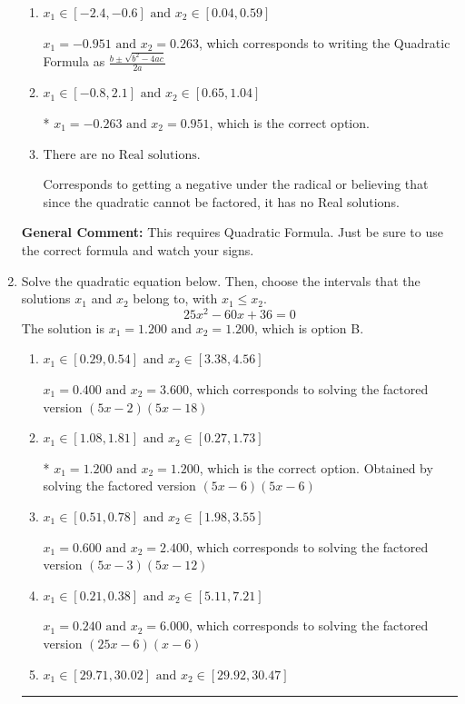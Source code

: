 \documentclass{extbook}[14pt]
\newcommand{\litem}[1]{\item #1

\rule{\textwidth}{0.4pt}}
\begin{document}
\begin{enumerate}
{\begin{enumerate}[label=\Alph*.]
 $x_1 = -4.208 \text{ and } x_2 = 15.208$, which corresponds to using the Quadratic Formula with $a=1$
\item \( x_1 \in [-2.4, -0.6] \text{ and } x_2 \in [0.04, 0.59] \)

 $x_1 = -0.951 \text{ and } x_2 = 0.263$, which corresponds to writing the Quadratic Formula as $\frac{b \pm \sqrt{b^2 - 4ac}}{2a}$
\item \( x_1 \in [-0.8, 2.1] \text{ and } x_2 \in [0.65, 1.04] \)

* $x_1 = -0.263 \text{ and } x_2 = 0.951$, which is the correct option.
\item \( \text{There are no Real solutions.} \)

Corresponds to getting a negative under the radical or believing that since the quadratic cannot be factored, it has no Real solutions.
\end{enumerate}

\textbf{General Comment:} This requires Quadratic Formula. Just be sure to use the correct formula and watch your signs.
}
\litem{
Solve the quadratic equation below. Then, choose the intervals that the solutions $x_1$ and $x_2$ belong to, with $x_1 \leq x_2$.
\[ 25x^{2} -60 x + 36 = 0 \]The solution is \( x_1 = 1.200 \text{ and } x_2 = 1.200 \), which is option B.\begin{enumerate}[label=\Alph*.]
\item \( x_1 \in [0.29, 0.54] \text{ and } x_2 \in [3.38, 4.56] \)

$x_1 = 0.400 \text{ and } x_2 = 3.600$, which corresponds to solving the factored version $(5x -2)(5x -18)$
\item \( x_1 \in [1.08, 1.81] \text{ and } x_2 \in [0.27, 1.73] \)

* $x_1 = 1.200 \text{ and } x_2 = 1.200$, which is the correct option. Obtained by solving the factored version $(5x -6)(5x -6)$
\item \( x_1 \in [0.51, 0.78] \text{ and } x_2 \in [1.98, 3.55] \)

$x_1 = 0.600 \text{ and } x_2 = 2.400$, which corresponds to solving the factored version $(5x -3)(5x -12)$
\item \( x_1 \in [0.21, 0.38] \text{ and } x_2 \in [5.11, 7.21] \)

$x_1 = 0.240 \text{ and } x_2 = 6.000$, which corresponds to solving the factored version $(25x -6)(x -6)$
\item \( x_1 \in [29.71, 30.02] \text{ and } x_2 \in [29.92, 30.47] \)


\end{enumerate}}
\end{enumerate}
\end{document}
